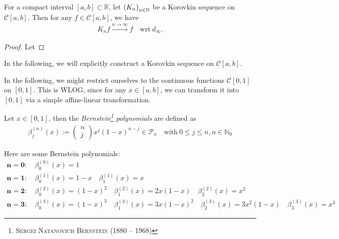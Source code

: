 \begin{theorem}[Korovkin, 1953]\label{thrm:korovkin_1953}
	For a compact interval $[a, b]\subset \mathbb R$, let $\seq[K_n]$ be a Korovkin sequence on $\mathcal C[a, b]$. Then for any $f\in\mathcal C[a, b]$, we have
	\begin{align}
		K_nf \overset{n\to\infty}{\longrightarrow} f \quad \text{wrt}\ d_{\infty}.
	\end{align}
\end{theorem}

\begin{proof}
	Let 
\end{proof}

In the following, we will explicitly construct a Korovkin sequence on $\mathcal C[a, b]$.

\begin{remark}
	In the following, we might restrict ourselves to the continuous functions $\mathcal C[0, 1]$ on $[0, 1]$. This is WLOG, since for any $x\in [a, b]$, we can transform it into $[0, 1]$ via a simple affine-linear transformation.
\end{remark}

\begin{defn}\label{defn:Bernstein-polynomials}
	Let $x\in[0, 1]$, then the \textit{Bernstein\footnote{\textsc{Sergei Natanovich Bernstein} (1880 -- 1968)} polynomials} are defined as
	\begin{align}
		\beta_{j}^{(n)}(x) := \begin{pmatrix}
			n \\ j
		\end{pmatrix} x^j (1 - x)^{n-j} \in\mathcal P_n \quad \text{with}\ 0\leq j\leq n, n\in \mathbb N_{0}
	\end{align}
\end{defn}

\begin{exmp}
	Here are some Bernstein polynomials:
	\begin{gather*}
		\bm{n = 0}: \quad \beta_{0}^{(0)}(x) = 1
		\\[6pt]
		\bm{n = 1}: \quad \beta_{0}^{(1)}(x) = 1 - x \quad \beta_{1}^{(1)}(x) = x
		\\[6pt]
		\bm{n = 2}: \quad \beta_{0}^{(2)}(x) = (1 - x)^2 \quad \beta_{1}^{(2)}(x) = 2x(1 - x) \quad \beta_{2}^{(2)}(x) = x^2
		\\[6pt]
		\bm{n = 3}: \quad \beta_{0}^{(3)}(x) = (1-x)^3 \quad \beta_{1}^{(3)}(x) = 3x(1-x)^2 \quad \beta_{2}^{(3)}(x) = 3x^2(1-x) \quad \beta_{3}^{(3)}(x) = x^3
	\end{gather*} 
\end{exmp}

